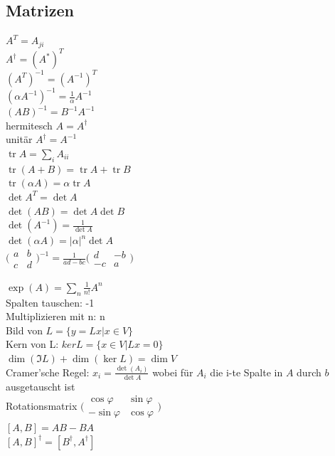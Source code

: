 \documentclass[12pt,a4paper, twoside]{article}
\DeclareMathOperator{\tr}{tr}
\newcommand{\abs}[1]{\left| #1 \right|}
\renewcommand{\=}[1]{\stackrel{#1}{=}}
\theoremstyle{definition}
\theoremstyle{remark}
\begin{document}
\subsection{Matrizen}

\begin{center}
\begin{minipage}[t]{.49\linewidth}
\vspace{0pt}
$A^T = A_{ji}$\\
$A^{\dagger} = (A^*)^T$\\
$(A^T)^{-1} = (A^{-1})^T$\\
$(\alpha A^{-1})^{-1} = \frac{1}{\alpha} A^{-1}$\\
$(AB)^{-1} = B^{-1} A^{-1}$\\
hermitesch $A = A^{\dagger}$\\
unitär $A^{\dagger} = A^{-1}$\\
$\tr A = \sum_i A_{ii}$\\
$\tr (A+B) = \tr A + \tr B$\\
$\tr (\alpha A) = \alpha \tr A$\\
$\det A^T = \det A$\\
$\det (AB) = \det A \det B$\\
$\det (A^{-1}) = \frac{1}{\det A}$\\
$\det (\alpha A) = \abs{\alpha}^n \det A$\\
$\bigl(\begin{smallmatrix} a & b\\
c & d \end{smallmatrix}\bigr)^{-1} = \frac{1}{ad-bc} \bigl(\begin{smallmatrix} d & -b\\
-c & a \end{smallmatrix}\bigr)$\\


\end{minipage}%
\begin{minipage}[t]{.49\linewidth}
\vspace{0pt}

$\exp (A) = \sum_n \frac{1}{n!} A^n$\\
Spalten tauschen: -1\\
Multiplizieren mit n: n\\
Bild von $L = \{y = Lx | x \in V\}$\\
Kern von L: $ker L = \{x \in V | L x = 0\}$\\
$\dim(\Im L) + \dim(\ker L) = \dim V$\\
Cramer'sche Regel: $x_i = \frac{\det (A_i)}{\det A}$ wobei für $A_i$ die i-te Spalte in $A$ durch $b$ ausgetauscht ist\\
Rotationsmatrix $\bigl(\begin{smallmatrix} \cos \varphi & \sin \varphi\\
-\sin \varphi & \cos \varphi \end{smallmatrix}\bigr)$\\
$[A, B] = AB-BA$\\
$[A,B]^{\dagger} = [B^{\dagger}, A^{\dagger}]$\\
\end{minipage}
\end{center}
\end{document}
